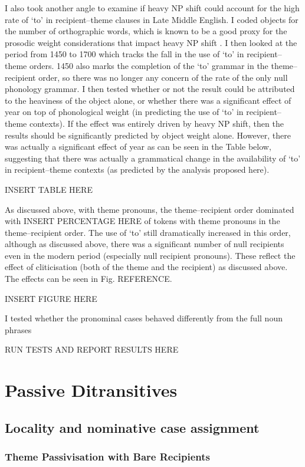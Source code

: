 \documentclass[11pt]{upenndiss}
\begin{document}
I also took another angle to examine if heavy NP shift could account for the high rate of `to' in recipient--theme clauses in Late Middle English. I coded objects for the number of orthographic words, which is known to be a good proxy for the prosodic weight considerations that impact heavy NP shift \citep{Bresnan.2007}. I then looked at the period from 1450 to 1700 which tracks the fall in the use of `to' in recipient--theme orders. 1450 also marks the completion of the `to' grammar in the theme--recipient order, so there was no longer any concern of the rate of the only null phonology grammar. I then tested whether or not the result could be attributed to the heaviness of the object alone, or whether there was a significant effect of year on top of phonological weight (in predicting the use of `to' in recipient--theme contexts). If the effect was entirely driven by heavy NP shift, then the results should be significantly predicted by object weight alone. However, there was actually a significant effect of year as can be seen in the Table below, suggesting that there was actually a grammatical change in the availability of `to' in recipient--theme contexts (as predicted by the analysis proposed here).

INSERT TABLE HERE

As discussed above, with theme pronouns, the theme--recipient order dominated with INSERT PERCENTAGE HERE of tokens with theme pronouns in the theme--recipient order. The use of `to' still dramatically increased in this order, although as discussed above, there was a significant number of null recipients even in the modern period (especially null recipient pronouns). These reflect the effect of cliticisation (both of the theme and the recipient) as discussed above. The effects can be seen in Fig. REFERENCE.

INSERT FIGURE HERE

I tested whether the pronominal cases behaved differently from the full noun phrases

RUN TESTS AND REPORT RESULTS HERE

\part{Passive Ditransitives}
\chapter{Locality and nominative case assignment}\label{ch:nominative-locality}
\section{Theme Passivisation with Bare Recipients}
\end{document}
